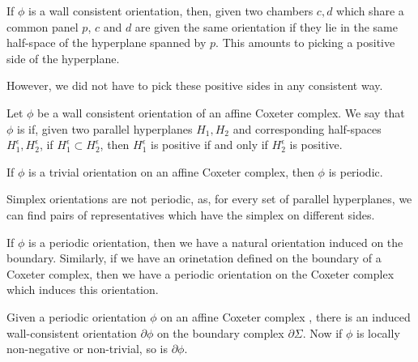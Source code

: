 \documentclass[11pt]{article}
\begin{document}
If $\phi$ is a wall consistent orientation, then, given two chambers $c,d$ which share a common panel $p$, $c$ and $d$ are given the same orientation if they lie in the same half-space of the hyperplane spanned by $p$. This amounts to picking a positive side of the hyperplane.

However, we did not have to pick these positive sides in any consistent way. 

\begin{definition}
    Let $\phi$ be a wall consistent orientation of an affine Coxeter complex. We say that $\phi$ is  if, given two parallel hyperplanes $H_1,H_2$ and corresponding half-spaces $H_1^{\epsilon},H_2^{\epsilon}$, if $H_1^{\epsilon}\subset H_2^{\epsilon}$, then $H_1^{\epsilon}$ is positive if and only if $H_2^{\epsilon}$ is positive. 
\end{definition}

\begin{example}
    If $\phi$ is a trivial orientation on an affine Coxeter complex, then $\phi$ is periodic. 
\end{example}

\begin{example}
    Simplex orientations are not periodic, as, for every set of parallel hyperplanes, we can find pairs of representatives which have the simplex on different sides.
\end{example}

If $\phi$ is a periodic orientation, then we have a natural orientation induced on the boundary. Similarly, if we have an orinetation defined on the boundary of a Coxeter complex, then we have a periodic orientation on the Coxeter complex which induces this orientation. 

\begin{lemma}\cite[p.125]{SHA}
    Given a periodic orientation $\phi$ on an affine Coxeter complex \sg, there is an induced wall-consistent orientation $\partial\phi$ on the boundary complex $\partial\Sigma$. Now if $\phi$ is locally non-negative or non-trivial, so is $\partial\phi$. 
\end{lemma}
\end{document}
